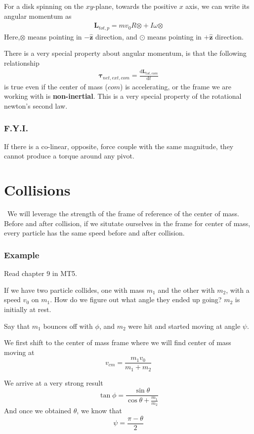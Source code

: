 \documentclass[12pt]{article}
\newcommand{\dydx}[2]{\frac{\text{d} #1}{\text{d} #2}}
\newcommand{\unz}{\hat{\mathbf{z}}}
\begin{document}
For a disk spinning on the $xy$-plane, towards the positive $x$ axis, we can write its angular momentum as
\begin{align}
\mathbf{L}_{tot,p} = mv_0R\boldsymbol{\otimes} + I\omega\boldsymbol{\otimes}
\end{align}
Here,$\boldsymbol{\otimes}$ means pointing in $-\unz$ direction, and $\boldsymbol{\odot}$ means pointing in $+\unz$ direction.

There is a very special property about angular momentum, is that the following relationship
\begin{align}
\boldsymbol\tau_{net,ext,com} = \dydx{\mathbf{L}_{tot,com}}{t}
\end{align}
is true even if the center of mass ($com$) is accelerating, or the frame we are working with is \textbf{non-inertial}. This is a very special property of the rotational newton's second law. 

\subsubsection{F.Y.I.}
If there is a co-linear, opposite, force couple with the same magnitude, they cannot produce a torque around any pivot. 

\section{Collisions}\
We will leverage the strength of the frame of reference of the center of mass. Before and after collision, if we situtate ourselves in the frame for center of mass, every particle has the same speed before and after collision.

\subsubsection{Example}
Read chapter 9 in MT5.

If we have two particle collides, one with mass $m_1$ and the other with $m_2$, with a speed $v_0$ on $m_1$. How do we figure out what angle they ended up going? $m_2$ is initially at rest. 

Say that $m_1$ bounces off with $\phi$, and $m_2$ were hit and started moving at angle $\psi$.

We first shift to the center of mass frame where we will find center of mass moving at
\[
v_{cm} = \frac{m_1 v_0}{m_1 + m_2}
\]


We arrive at a very strong result
\[
\tan \phi = \frac{\sin\theta}{\cos\theta + \frac{m_1}{m_2}}
\]
And once we obtained $\theta$, we know that
\[
\psi = \frac{\pi - \theta}{2}
\]
\end{document}
